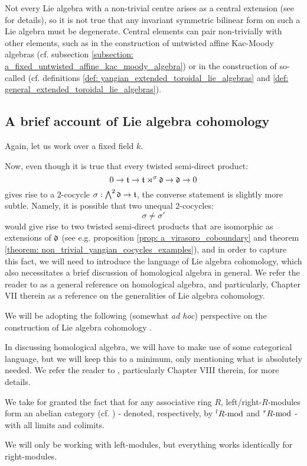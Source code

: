 \begin{remark}
            Not every Lie algebra with a non-trivial centre arises as a central extension (see \cite[Section 1]{garland_arithmetics_of_loop_groups} for details), so it is not true that any invariant symmetric bilinear form on such a Lie algebra must be degenerate. Central elements can pair non-trivially with other elements, such as in the construction of untwisted affine Kac-Moody algebras (cf. subsection \ref{subsection: a_fixed_untwisted_affine_kac_moody_algebra}) or in the construction of so-called  (cf. definitions \ref{def: yangian_extended_toroidal_lie_algebras} and \ref{def: general_extended_toroidal_lie_algebras}).
        \end{remark}

    \subsection{A brief account of Lie algebra cohomology}
        Again, let us work over a fixed field $k$.
    
        Now, even though it is true that every twisted semi-direct product:
            $$0 \to \t \to \t \rtimes^{\sigma} \d \to \d \to 0$$
        gives rise to a $2$-cocycle $\sigma: \bigwedge^2 \d \to \t$, the converse statement is slightly more subtle. Namely, it is possible that two unequal $2$-cocycles:
            $$\sigma \not = \sigma'$$
        would give rise to two twisted semi-direct products that are isomorphic as extensions of $\d$ (see e.g. proposition \ref{prop: a_virasoro_coboundary} and theorem \ref{theorem: non_trivial_yangian_cocycles_examples}), and in order to capture this fact, we will need to introduce the language of Lie algebra cohomology, which also necessitates a brief discussion of homological algebra in general. We refer the reader to \cite{hilton_stammbach_homological_algebra} as a general reference on homological algebra, and particularly, Chapter VII therein as a reference on the generalities of Lie algebra cohomology. 

        We will be adopting the following (somewhat \textit{ad hoc}) perspective on the construction of Lie algebra cohomology .
        \begin{convention}
            In discussing homological algebra, we will have to make use of some categorical language, but we will keep this to a minimum, only mentioning what is absolutely needed. We refer the reader to \cite{maclane}, particularly Chapter VIII therein, for more details.
        \end{convention}
        \begin{convention}
            We take for granted the fact that for any associative ring $R$, left/right-$R$-modules form an abelian category (cf. \cite[Section VIII.3, p. 198]{maclane}) - denoted, respectively, by ${}^lR\mod$ and ${}^rR\mod$ - with all limits and colimits.

            We will only be working with left-modules, but everything works identically for right-modules.
        \end{convention}

